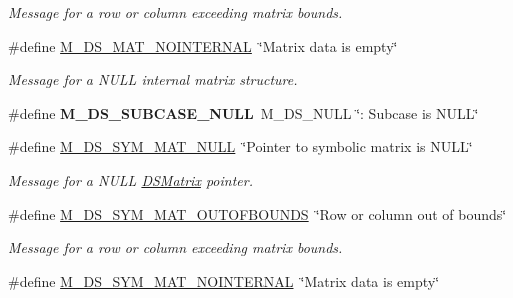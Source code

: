 \begin{DoxyCompactItemize}
\begin{DoxyCompactList}\small\item\em Message for a row or column exceeding matrix bounds. \item\end{DoxyCompactList}\item 
\hypertarget{group___m___d_s___messages_ga834bdead8f9b0e20331b57e051c7f379}{
\#define \hyperlink{group___m___d_s___messages_ga834bdead8f9b0e20331b57e051c7f379}{M\_\-DS\_\-MAT\_\-NOINTERNAL}~\char`\"{}Matrix data is empty\char`\"{}}
\label{group___m___d_s___messages_ga834bdead8f9b0e20331b57e051c7f379}

\begin{DoxyCompactList}\small\item\em Message for a NULL internal matrix structure. \item\end{DoxyCompactList}\item 
\hypertarget{group___m___d_s___messages_ga02efbba8bea9dd19aa20f9432257b351}{
\#define {\bfseries M\_\-DS\_\-SUBCASE\_\-NULL}~M\_\-DS\_\-NULL \char`\"{}: Subcase is NULL\char`\"{}}
\label{group___m___d_s___messages_ga02efbba8bea9dd19aa20f9432257b351}

\item 
\hypertarget{group___m___d_s___messages_gab1c842ea678de8daa76a55fc68750d5e}{
\#define \hyperlink{group___m___d_s___messages_gab1c842ea678de8daa76a55fc68750d5e}{M\_\-DS\_\-SYM\_\-MAT\_\-NULL}~\char`\"{}Pointer to symbolic matrix is NULL\char`\"{}}
\label{group___m___d_s___messages_gab1c842ea678de8daa76a55fc68750d5e}

\begin{DoxyCompactList}\small\item\em Message for a NULL \hyperlink{struct_d_s_matrix}{DSMatrix} pointer. \item\end{DoxyCompactList}\item 
\hypertarget{group___m___d_s___messages_gad8ee7418e1f3268fa9841bc7d7fcf898}{
\#define \hyperlink{group___m___d_s___messages_gad8ee7418e1f3268fa9841bc7d7fcf898}{M\_\-DS\_\-SYM\_\-MAT\_\-OUTOFBOUNDS}~\char`\"{}Row or column out of bounds\char`\"{}}
\label{group___m___d_s___messages_gad8ee7418e1f3268fa9841bc7d7fcf898}

\begin{DoxyCompactList}\small\item\em Message for a row or column exceeding matrix bounds. \item\end{DoxyCompactList}\item 
\hypertarget{group___m___d_s___messages_ga24ff99c3a2bfe77b32048fa05cb19a44}{
\#define \hyperlink{group___m___d_s___messages_ga24ff99c3a2bfe77b32048fa05cb19a44}{M\_\-DS\_\-SYM\_\-MAT\_\-NOINTERNAL}~\char`\"{}Matrix data is empty\char`\"{}}
\label{group___m___d_s___messages_ga24ff99c3a2bfe77b32048fa05cb19a44}


\end{DoxyCompactItemize}
